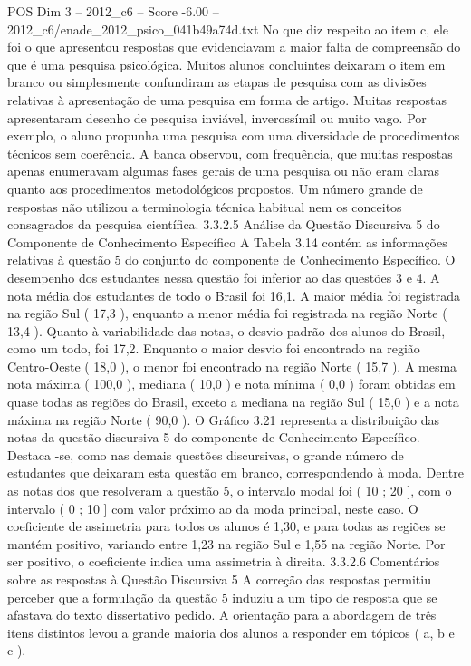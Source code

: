 \begin{textsample}{POS Dim 3 – 2012\_c6 – Score -6.00 – 2012\_c6/enade\_2012\_psico\_041b49a74d.txt}
No que diz respeito ao item c, ele foi o que apresentou respostas que evidenciavam a maior falta de compreensão do que é uma pesquisa psicológica.
Muitos alunos concluintes deixaram o item em branco ou simplesmente confundiram as etapas de pesquisa com as divisões relativas à apresentação de uma pesquisa em forma de artigo.
Muitas respostas apresentaram desenho de pesquisa inviável, inverossímil ou muito vago.
Por exemplo, o aluno propunha uma pesquisa com uma diversidade de procedimentos técnicos sem coerência.
A banca observou, com frequência, que muitas respostas apenas enumeravam algumas fases gerais de uma pesquisa ou não eram claras quanto aos procedimentos metodológicos propostos.
Um número grande de respostas não utilizou a terminologia técnica habitual nem os conceitos consagrados da pesquisa científica. 3.3.2.5 Análise da Questão Discursiva 5 do Componente de Conhecimento Específico A Tabela 3.14 contém as informações relativas à questão 5 do conjunto do componente de Conhecimento Específico.
O desempenho dos estudantes nessa questão foi inferior ao das questões 3 e 4.
A nota média dos estudantes de todo o Brasil foi 16,1.
A maior média foi registrada na região Sul ( 17,3 ), enquanto a menor média foi registrada na região Norte ( 13,4 ).
Quanto à variabilidade das notas, o desvio padrão dos alunos do Brasil, como um todo, foi 17,2.
Enquanto o maior desvio foi encontrado na região Centro-Oeste ( 18,0 ), o menor foi encontrado na região Norte ( 15,7 ).
A mesma nota máxima ( 100,0 ), mediana ( 10,0 ) e nota mínima ( 0,0 ) foram obtidas em quase todas as regiões do Brasil, exceto a mediana na região Sul ( 15,0 ) e a nota máxima na região Norte ( 90,0 ).
O Gráfico 3.21 representa a distribuição das notas da questão discursiva 5 do componente de Conhecimento Específico.
Destaca -se, como nas demais questões discursivas, o grande número de estudantes que deixaram esta questão em branco, correspondendo à moda.
Dentre as notas dos que resolveram a questão 5, o intervalo modal foi ( 10 ; 20 ], com o intervalo ( 0 ; 10 ] com valor próximo ao da moda principal, neste caso.
O coeficiente de assimetria para todos os alunos é 1,30, e para todas as regiões se mantém positivo, variando entre 1,23 na região Sul e 1,55 na região Norte.
Por ser positivo, o coeficiente indica uma assimetria à direita. 3.3.2.6 Comentários sobre as respostas à Questão Discursiva 5 A correção das respostas permitiu perceber que a formulação da questão 5 induziu a um tipo de resposta que se afastava do texto dissertativo pedido.
A orientação para a abordagem de três itens distintos levou a grande maioria dos alunos a responder em tópicos ( a, b e c ).

\end{textsample}

